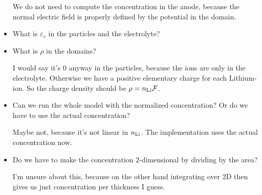 \documentclass[a4paper,11pt]{scrartcl}
\newcommand*{\Li}{\ce{Li}}
\newcommand*{\n}{n_{\Li}}
\newcommand*{\F}{\mathcal{F}}
\begin{document}
\begin{itemize}
  We do not need to compute the concentration in the anode, because the normal
  electric field is properly defined by the potential in the domain.

\item What is $\varepsilon_r$ in the particles and the electrolyte?

\item What is $\rho$ in the domains?

  I would say it's 0 anyway in the particles, because the ions are only in the electrolyte.
  Otherwise we have a positive elementary charge for each Lithium-ion.
  So the charge density should be $\rho = \n \F$.

\item Can we run the whole model with the normalized concentration?
  Or do we have to use the actual concentration?

  Maybe not, because it's not linear in $\n$.
  The implementation uses the actual concentration now.

\item Do we have to make the concentration 2-dimensional by dividing by the area?

  I'm unsure about this, because on the other hand integrating over 2D then
  gives us just concentration per thickness I guess.

\end{itemize}

{}

\end{document}
